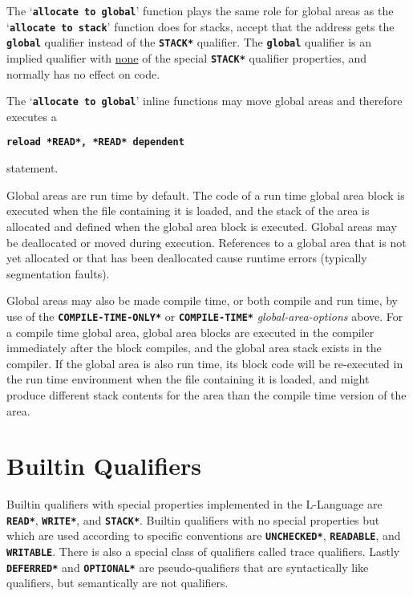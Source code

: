 \documentclass[12pt]{article}
\newcommand{\TT}[1]{{\tt \bfseries #1}}
\newcommand{\EOL}{\penalty \exhyphenpenalty}
\begin{document}
The `\TT{allocate to global}' function plays the same role for
global areas as the `\TT{allocate to stack}' function does for
stacks, accept that the address gets the \TT{global} qualifier
instead of the \TT{*STACK*} qualifier.  The \TT{global} qualifier
is an implied qualifier
with \underline{none} of the special \TT{*STACK*}
qualifier properties, and normally has no effect on code.

The `\TT{allocate to global}' inline functions may move
global areas and therefore executes a
\begin{center}
\TT{reload *READ*, *READ* dependent}
\end{center}
statement.

Global areas are run time by default.
The code of a run time
global area block is executed when the file containing it is
loaded, and the stack of the area is allocated and defined when
the global area block is executed.
Global areas may be deallocated or moved during execution.
References to a global area
that is not yet allocated or that has been deallocated cause runtime
errors (typically segmentation faults).

Global areas may also be made compile time, or both compile and run time,
by use of the \TT{*COM\-PILE-\EOL TIME-\EOL ONLY*} or \TT{*COMPILE-\EOL TIME*}
{\em global-\EOL area-\EOL options} above.  For a compile time
global area, global area blocks are executed in the compiler immediately
after the block compiles, and the global area stack exists in the compiler.
If the global area is also run time, its
block code will be re-executed in the run time environment when the
file containing it is loaded, and might produce different stack contents
for the area than the compile time version of the area.

\section{Builtin Qualifiers}
\label{BUILTIN-QUALIFIERS}

Builtin qualifiers with special properties implemented in the L-Language
are \TT{*READ*}, \TT{*WRITE*}, and \TT{*STACK*}.
Builtin qualifiers with no special properties but which are used
according to specific conventions are \TT{*UNCHECKED*}, \TT{*READABLE},
and \TT{*WRITABLE}.
There is also a special class of qualifiers called trace qualifiers.
Lastly \TT{*DEFERRED*} and \TT{*OPTIONAL*} are pseudo-qualifiers that are
syntactically like qualifiers, but semantically are not qualifiers.
\end{document}
